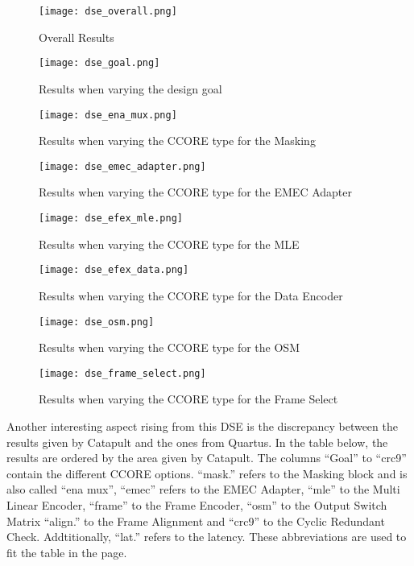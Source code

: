\begin{itemize}
\begin{figure}
    \centering
    \texttt{[image: dse\_overall.png]}
    \caption{Overall Results}
    \label{fig:dse-overall}
    \centering
    \texttt{[image: dse\_goal.png]}
    \caption{Results when varying the design goal}
    \label{fig:dse-goal}
\end{figure}
\begin{figure}
    \centering
    \texttt{[image: dse\_ena\_mux.png]}
    \caption{Results when varying the CCORE type for the Masking}
    \label{fig:dse-ena-mux}
    \centering
    \texttt{[image: dse\_emec\_adapter.png]}
    \caption{Results when varying the CCORE type for the EMEC Adapter}
    \label{fig:dse-emec-adapter}
\end{figure}
\begin{figure}
    \centering
    \texttt{[image: dse\_efex\_mle.png]}
    \caption{Results when varying the CCORE type for the MLE}
    \label{fig:dse-efex-mle}    
    \centering
    \texttt{[image: dse\_efex\_data.png]}
    \caption{Results when varying the CCORE type for the Data Encoder}
    \label{fig:dse-efex-data}
\end{figure}
\begin{figure}
    \centering
    \texttt{[image: dse\_osm.png]}
    \caption{Results when varying the CCORE type for the OSM}
    \label{fig:dse-osm}
    \centering
    \texttt{[image: dse\_frame\_select.png]}
    \caption{Results when varying the CCORE type for the Frame Select}
    \label{fig:dse-frame-select}
\end{figure}

Another interesting aspect rising from this DSE is the discrepancy between the results given by Catapult and the ones from Quartus. In the table below, the results are ordered by the area given by Catapult. The columns ``Goal'' to ``crc9'' contain the different CCORE options. ``mask.'' refers to the Masking block and is also called ``ena mux'',  ``emec'' refers to the EMEC Adapter, ``mle'' to the Multi Linear Encoder, ``frame'' to the Frame Encoder, ``osm'' to the Output Switch Matrix ``align.'' to the Frame Alignment and ``crc9'' to the Cyclic Redundant Check. Addtitionally, ``lat.'' refers to the latency. These abbreviations are used to fit the table in the page.


\end{itemize}
